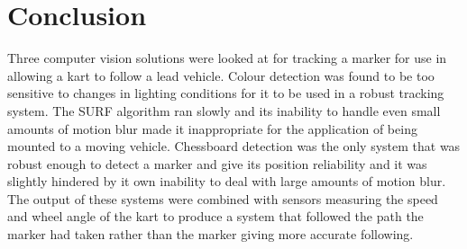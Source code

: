 \section{Conclusion}

Three computer vision solutions were looked at for tracking a marker for use in allowing a kart to follow a lead vehicle. Colour detection was found to be too sensitive to changes in lighting conditions for it to be used in a robust tracking system. The SURF algorithm ran slowly and its inability to handle even small amounts of motion blur made it inappropriate for the application of being mounted to a moving vehicle. Chessboard detection was the only system that was robust enough to detect a marker and give its position reliability and it was slightly hindered by it own inability to deal with large amounts of motion blur. The output of these systems were combined with sensors measuring the speed and wheel angle of the kart to produce a system that followed the path the marker had taken rather than the marker giving more accurate following. 